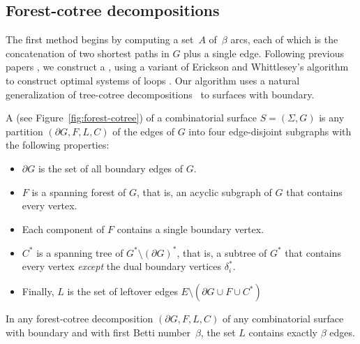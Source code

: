 \documentclass[letterpaper,review]{siamart190516}
\begin{document}
\subsection{Forest-cotree decompositions}
\label{sec:forest-cotree}

The first method begins by computing a set~$A$ of~$\beta$ arcs, each of which is the concatenation of two shortest paths in $G$ plus a single edge.
%
Following previous papers \cite{ccelw-scsih-08, ce-tnpcs-10, c-scgsp-10}, we construct a , using a variant of Erickson and Whittlesey's algorithm to construct optimal systems of loops \cite{ew-gohhg-05}.  Our algorithm uses a natural generalization of tree-cotree decompositions~\cite{e-dgteg-03} to surfaces with boundary.

A  (see Figure~\ref{fig:forest-cotree}) of a combinatorial surface $S = (\Sigma, G)$ is any partition $(\partial\! G, F, L, C)$ of the edges of $G$ into four edge-disjoint subgraphs with the following properties:
\begin{itemize}\itemsep0pt
\item $\partial\! G$ is the set of all boundary edges of $G$.
\item $F$ is a spanning forest of $G$, that is, an acyclic subgraph of $G$ that contains every vertex.
\item Each component of $F$ contains a single boundary vertex.
\item $C^*$ is a spanning tree of $G^*\setminus (\partial G)^*$, that is, a subtree of $G^*$ that contains every vertex \emph{except} the dual boundary vertices $\delta_i^*$.
\item Finally, $L$ is the set of leftover edges $E \setminus (\partial\!G \cup F \cup C^*)$
\end{itemize}

\begin{lemma}
\label{lem:L_edges}
In any forest-cotree decomposition $(\partial\! G, F, L, C)$ of any combinatorial surface with boundary and with first Betti number~$\beta$, the set $L$ contains exactly $\beta$ edges.
\end{lemma}
\end{document}
